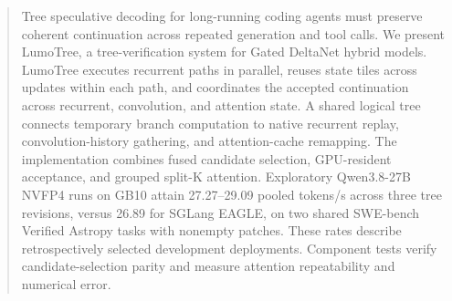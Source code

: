 \begin{abstract}
Tree speculative decoding for long-running coding agents must preserve coherent continuation across repeated generation and tool calls. We present LumoTree, a tree-verification system for Gated DeltaNet hybrid models. LumoTree executes recurrent paths in parallel, reuses state tiles across updates within each path, and coordinates the accepted continuation across recurrent, convolution, and attention state. A shared logical tree connects temporary branch computation to native recurrent replay, convolution-history gathering, and attention-cache remapping. The implementation combines fused candidate selection, GPU-resident acceptance, and grouped split-K attention. Exploratory Qwen3.8-27B NVFP4 runs on GB10 attain 27.27--29.09 pooled tokens/s across three tree revisions, versus 26.89 for SGLang EAGLE, on two shared SWE-bench Verified Astropy tasks with nonempty patches. These rates describe retrospectively selected development deployments. Component tests verify candidate-selection parity and measure attention repeatability and numerical error.
\end{abstract}
